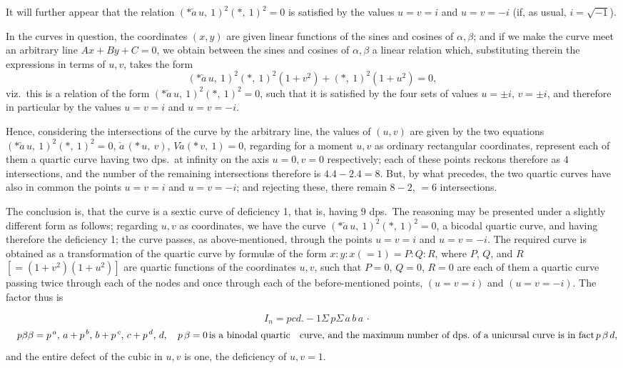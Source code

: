 \documentclass[11pt,a4paper]{book}
\begin{document}
It will further appear that the relation $(\ast\check{a}\,u,\ 1)^2 (\ast,\ 1)^2 = 0$ is satisfied by the
values $u = v = i$ and $u = v = -i$ (if, as usual, $i = \sqrt{-1}$).

In the curves in question, the coordinates $(x, y)$ are given linear functions of the sines
and cosines of $\alpha, \beta$; and if we make the curve meet an arbitrary line $Ax + By + C = 0$,
we obtain between the sines and cosines of $\alpha, \beta$ a linear relation which, substituting
therein the expressions in terms of $u, v$, takes the form
\[
(\ast\check{a}\,u,\ 1)^2 (\ast,\ 1)^2 (1 + v^2) + (\ast,\ 1)^2 (1 + u^2) = 0,
\]
viz.\ this is a relation of the form $(\ast\check{a}\,u,\ 1)^2 (\ast,\ 1)^2 = 0$, such that it is satisfied by
the four sets of values $u = \pm i$, $v = \pm i$, and therefore in particular by the values
$u = v = i$ and $u = v = -i$.

Hence, considering the intersections of the curve by the arbitrary line, the values
of $(u, v)$ are given by the two equations $(\ast\check{a}\,u,\ 1)^2 (\ast,\ 1)^2 = 0$, $\check{a}\,(\ast\,u,\ v)$, $V\check{a}(\ast\,v,\ 1) = 0$,
regarding for a moment $u, v$ as ordinary rectangular coordinates, represent each of them
a quartic curve having two dps.\ at infinity on the axis $u = 0, v = 0$ respectively; each
of these points reckons therefore as $4$ intersections, and the number of the remaining
intersections therefore is $4.4 - 2.4 = 8$. But, by what precedes, the two quartic curves
have also in common the points $u = v = i$ and $u = v = -i$; and rejecting these, there
remain $8 - 2$, $= 6$ intersections.

The conclusion is, that the curve is a sextic curve of deficiency 1, that is, having
$9$ dps.\ The reasoning may be presented under a slightly different form as follows;
regarding $u, v$ as coordinates, we have the curve $(\ast\check{a}\,u,\ 1)^2 (\ast,\ 1)^2 = 0$, a bicodal quartic
curve, and having therefore the deficiency 1; the curve passes, as above-mentioned,
through the points $u = v = i$ and $u = v = -i$. The required curve is obtained as a
transformation of the quartic curve by formul\ae{} of the form $x : y : x(=1) = P : Q : R$,
where $P$, $Q$, and $R$ $[=(1 + v^2)(1 + u^2)]$ are quartic functions of the coordinates $u, v$,
such that $P = 0$, $Q = 0$, $R = 0$ are each of them a quartic curve passing twice through
each of the nodes and once through each of the before-mentioned points, $(u = v = i)$
and $(u = v = -i)$. The factor thus is

\[
\quad I_n = pcd. - 1\Sigma\,p\Sigma\,a\,b\,a\,\cdot
\]
\[
\quad p\beta\beta = p^{\,a},\,a + p^{\,b},\,b + p^{\,c},\,c + p^{\,d},\,d, \quad p\,\beta = 0 \, \text{is a binodal quartic}\\
\quad \text{curve, and the maximum number of dps.\ of a unicursal curve is in fact} \, p\,\beta\,d,
\]
and the entire defect of the cubic in $u, v$ is one, the deficiency of $u, v = 1$.
\end{document}
